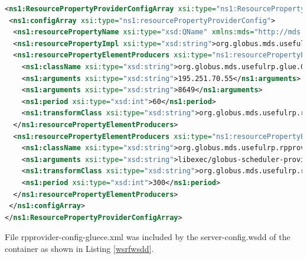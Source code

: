 \begin{lstlisting}[language=XML,caption=Ganglia Resource Provider for WSRF Index,label=wsrfrp]
<ns1:ResourcePropertyProviderConfigArray xsi:type="ns1:ResourcePropertyProviderConfigArray" xmlns:ns1="http://mds.globus.org/rpprovider/2005/08" xmlns:xsi="http://www.w3.org/2001/XMLSchema-instance">
 <ns1:configArray xsi:type="ns1:resourcePropertyProviderConfig">
  <ns1:resourcePropertyName xsi:type="xsd:QName" xmlns:mds="http://mds.globus.org/glue/ce/1.1">mds:GLUECE</ns1:resourcePropertyName>
  <ns1:resourcePropertyImpl xsi:type="xsd:string">org.globus.mds.usefulrp.rpprovider.GLUEResourceProperty</ns1:resourcePropertyImpl>
  <ns1:resourcePropertyElementProducers xsi:type="ns1:resourcePropertyElementProducerConfig">
    <ns1:className xsi:type="xsd:string">org.globus.mds.usefulrp.glue.GangliaElementProducer</ns1:className>
    <ns1:arguments xsi:type="xsd:string">195.251.70.55</ns1:arguments>
    <ns1:arguments xsi:type="xsd:string">8649</ns1:arguments>
    <ns1:period xsi:type="xsd:int">60</ns1:period>
    <ns1:transformClass xsi:type="xsd:string">org.globus.mds.usefulrp.rpprovider.transforms.GLUEComputeElementTransform</ns1:transformClass>
  </ns1:resourcePropertyElementProducers>
  <ns1:resourcePropertyElementProducers xsi:type="ns1:resourcePropertyElementProducerConfig">
    <ns1:className xsi:type="xsd:string">org.globus.mds.usefulrp.rpprovider.producers.SchedulerInfoElementProducer</ns1:className>
    <ns1:arguments xsi:type="xsd:string">libexec/globus-scheduler-provider-fork</ns1:arguments>
    <ns1:transformClass xsi:type="xsd:string">org.globus.mds.usefulrp.rpprovider.transforms.GLUESchedulerElementTransform</ns1:transformClass>
    <ns1:period xsi:type="xsd:int">300</ns1:period>
  </ns1:resourcePropertyElementProducers>
 </ns1:configArray>
</ns1:ResourcePropertyProviderConfigArray>
\end{lstlisting}

File rpprovider-config-gluece.xml was included by the server-config.wsdd of the container as shown in Listing \ref{wsrfwsdd}.

